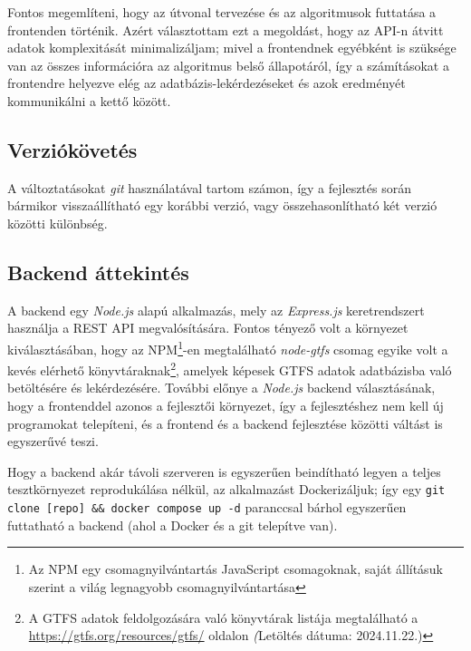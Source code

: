 Fontos megemlíteni, hogy az útvonal tervezése és az algoritmusok futtatása a frontenden történik. Azért választottam ezt a megoldást, hogy az API-n átvitt adatok komplexitását minimalizáljam; mivel a frontendnek egyébként is szüksége van az összes információra az algoritmus belső állapotáról, így a számításokat a frontendre helyezve elég az adatbázis-lekérdezéseket és azok eredményét kommunikálni a kettő között.

\subsection{Verziókövetés}

A változtatásokat \textit{git} használatával tartom számon, így a fejlesztés során bármikor visszaállítható egy korábbi verzió, vagy összehasonlítható két verzió közötti különbség.

\subsection{Backend áttekintés}

A backend egy \textit{Node.js} alapú alkalmazás, mely az \textit{Express.js} keretrendszert használja a REST API megvalósítására. Fontos tényező volt a környezet kiválasztásában, hogy az NPM\footnote{Az NPM egy csomagnyilvántartás JavaScript csomagoknak, saját állításuk szerint a világ legnagyobb csomagnyilvántartása\cite{nodeabout}}-en megtalálható \textit{node-gtfs}\cite{nodegtfs} csomag egyike volt a kevés elérhető könyvtáraknak\footnote{A GTFS adatok feldolgozására való könyvtárak listája megtalálható a \url{https://gtfs.org/resources/gtfs/} oldalon \textit(Letöltés dátuma: 2024.11.22.)}, amelyek képesek GTFS adatok adatbázisba való betöltésére és lekérdezésére. További előnye a \textit{Node.js} backend választásának, hogy a frontenddel azonos a fejlesztői környezet, így a fejlesztéshez nem kell új programokat telepíteni, és a frontend és a backend fejlesztése közötti váltást is egyszerűvé teszi.

Hogy a backend akár távoli szerveren is egyszerűen beindítható legyen a teljes tesztkörnyezet reprodukálása nélkül, az alkalmazást Dockerizáljuk; így egy \texttt{git clone [repo] \&\& docker compose up -d} paranccsal bárhol egyszerűen futtatható a backend (ahol a Docker és a git telepítve van).

